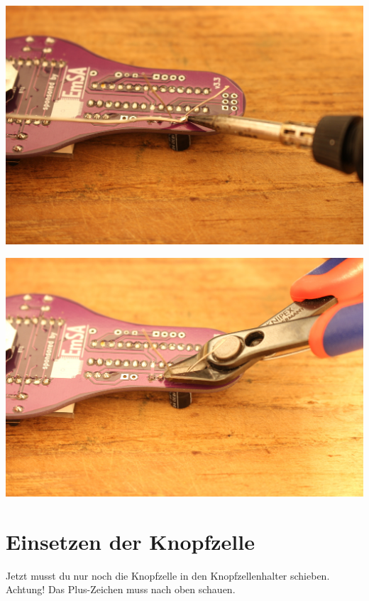 \documentclass{article}
\begin{document}
\begin{minipage}[b]{0.5\textwidth}
	\includegraphics[width=\textwidth]{Bilder2024/IMG_0072.JPG}
\end{minipage}
\begin{minipage}[b]{0.5\textwidth}
	\includegraphics[width=\textwidth]{Bilder2024/IMG_0074.JPG}
\end{minipage}

\section{Einsetzen der Knopfzelle}

Jetzt musst du nur noch die Knopfzelle in den Knopfzellenhalter schieben.
Achtung! Das Plus-Zeichen muss nach oben schauen.

\vspace{1cm}
\end{document}
